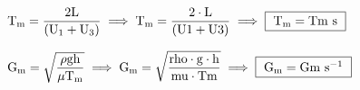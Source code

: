 \documentclass{article}
\newcommand{\myspace}{0.5cm}
\begin{document}
\vspace{\myspace}

\begin{center}
	$
		\mathrm
		{
			T_{m} = \dfrac{2L}{\left ( U_{1} + U_{3} \right)}
		} 
		\implies
		\mathrm
		{
			T_{m} = \dfrac{2\cdot {{L}} }{\left ( {{U1}} + {{U3}} \right)}
		}
		\implies 
		\fbox
		{ 
			$\mathrm
			{
				T_{m}= {{Tm}} \ s
			}$
		}
	$
\end{center}

\vspace{\myspace}

\begin{center}
	$
		\mathrm
		{
			G_{m} = \sqrt{\dfrac{\rho g h}{\mu T_{m}}}
		} 
		\implies
		\mathrm
		{
			G_{m} = \sqrt{\dfrac{ {{rho}} \cdot {{g}} \cdot  {{h}} }{ {{mu}} \cdot {{Tm}} }} } 
		\implies 
		\fbox
		{
			$\mathrm
			{
				G_{m} = {{Gm}} \ s^{-1}
			}$
		}
	$
\end{center}

\newpage

\end{document}
